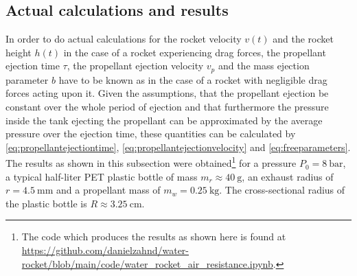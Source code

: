 \documentclass[a4paper,11pt]{report}
\begin{document}
\subsection{Actual calculations and results}
In order to do actual calculations for the rocket velocity $v(t)$ and the rocket height $h(t)$ in the case of a rocket experiencing drag forces, the propellant ejection time $\tau$, the propellant ejection  velocity $v_p$ and the mass ejection parameter $b$ have to be known as in the case of a rocket with negligible drag forces acting upon it. Given the assumptions, that the propellant ejection be constant over the whole period of ejection and that furthermore the pressure inside the tank ejecting the propellant can be approximated by the average pressure over the ejection time, these quantities can be calculated by \cref{eq:propellantejectiontime}, \cref{eq:propellantejectionvelocity} and \cref{eq:freeparameters}. The results as shown in this subsection were obtained\footnote{The code which produces the results as shown here is found at \url{https://github.com/danielzahnd/water-rocket/blob/main/code/water_rocket_air_resistance.ipynb}.} for a pressure $P_0 = \SI{8}{\bar}$, a typical half-liter PET plastic bottle of mass $m_r \approx \SI{40}{\gram}$, an exhaust radius of $r = \SI{4.5}{\milli\meter}$ and a propellant mass of $m_w = \SI{0.25}{\kilo\gram}$. The cross-sectional radius of the plastic bottle is $R \approx \SI{3.25}{\centi\meter}$.
\end{document}
